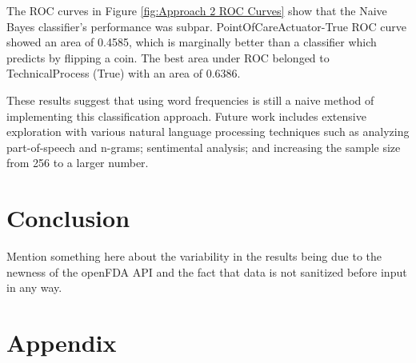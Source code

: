 \documentclass[11pt, notitlepage,abstracton,oneside]{article}   	%
\begin{document}
The ROC curves in Figure \ref{fig:Approach 2 ROC Curves} show that the Naive Bayes classifier's performance was subpar. PointOfCareActuator-True ROC curve showed an area of 0.4585, which is marginally better than a classifier which predicts by flipping a coin. The best area under ROC belonged to TechnicalProcess (True) with an area of 0.6386.

These results suggest that using word frequencies is still a naive method of implementing this classification approach. Future work includes extensive exploration with various natural language processing techniques such as analyzing part-of-speech and n-grams; sentimental analysis; and increasing the sample size from 256 to a larger number.

\section{Conclusion}
Mention something here about the variability in the results being due to the newness of the openFDA API and the fact that data is not sanitized before input in any way.

\section{Appendix}
\end{document}

